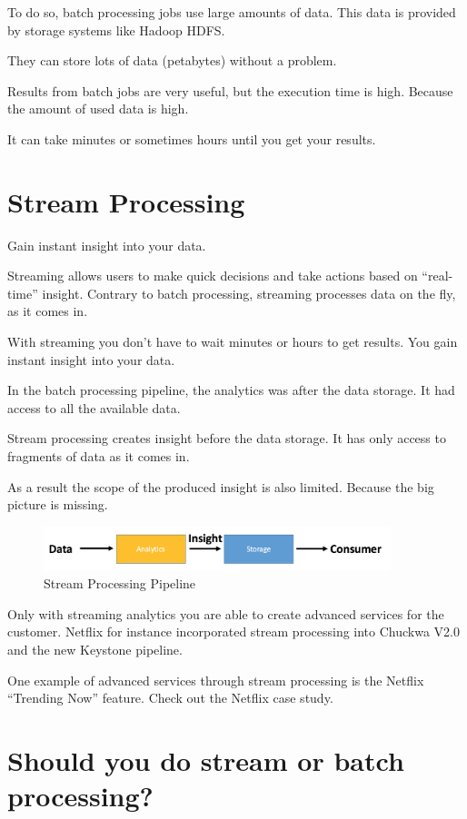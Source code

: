 \documentclass[12pt, numbers=noenddot]{scrreprt} %
\begin{document}
To do so, batch processing jobs use large amounts of data. This data is provided by storage systems like Hadoop HDFS.

They can store lots of data (petabytes) without a problem.

Results from batch jobs are very useful, but the execution time is high. Because the amount of used data is high.

It can take minutes or sometimes hours until you get your results.



\section{Stream Processing} Gain instant insight into your data.

Streaming allows users to make quick decisions and take actions based on “real-time” insight. Contrary to batch processing, streaming processes data on the fly, as it comes in.

With streaming you don’t have to wait minutes or hours to get results. You gain instant insight into your data.

In the batch processing pipeline, the analytics was after the data storage. It had access to all the available data.

Stream processing creates insight before the data storage. It has only access to fragments of data as it comes in.

As a result the scope of the produced insight is also limited. Because the big picture is missing.

\begin{figure}[htbp]
  \centering
     \includegraphics[width=0.9\textwidth]{images/Simple-Stream-Processing-Workflow.png}
  \caption{Stream Processing Pipeline}
  \label{fig:Bild1}
\end{figure}

Only with streaming analytics you are able to create advanced services for the customer. Netflix for instance incorporated stream processing into Chuckwa V2.0 and the new Keystone pipeline.

One example of advanced services through stream processing is the Netflix “Trending Now” feature.
Check out the Netflix case study.

\section{Should you do stream or batch processing?}
\end{document}
